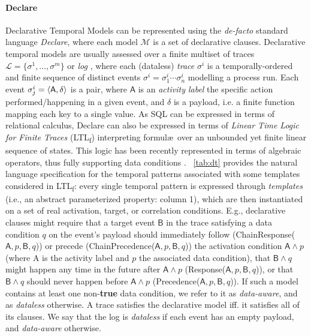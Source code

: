 \documentclass[sigconf]{acmart}
\newcommand{\LTLf}{\textup{LTL}\textsubscript{f}\xspace}
\begin{document}
\paragraph*{Declare} Declarative Temporal Models can be represented using the \textit{de-facto} standard language \textit{Declare}, where each model $\mathcal{M}$ is a set of declarative clauses. Declarative temporal models are usually assessed over a finite multiset of traces $\mathcal{L}=\{\sigma^1,\dots,\sigma^m\}$ or \textit{log} \cite{info14030173}, where each (dataless) \textit{trace} $\sigma^i$ is a temporally-ordered and finite sequence of distinct events $\sigma^i=\sigma^i_1\cdots \sigma^i_n$ modelling a process run. Each event $\sigma^i_j=\braket{\textsf{A},\delta}$ is a pair, where $\textsf{A}$ is an \textit{activity label} the specific action performed/happening in a given event, and $\delta$ is a payload, i.e. a finite function mapping each key to a single value. As SQL can be expressed in terms of relational calculus, Declare can also be expressed in terms of \textit{Linear Time Logic for Finite Traces} (\LTLf) \cite{Li2020} interpreting formul\ae\, over an unbounded yet finite linear sequence of states. This logic has been recently represented in terms of algebraic operators, thus fully supporting data conditions \cite{info14030173}.  \tablename~\ref{tab:dt} provides the natural language specification for the temporal patterns associated with some templates considered in \LTLf: every single temporal pattern is expressed through \textit{templates} (i.e., an abstract parameterized property: column 1), which are then instantiated on a set of real activation, target, or correlation conditions. E.g., declarative clauses might require that a target event $\textsf{B}$ in the trace satisfying a data condition $q$ on the event's payload should immediately follow (\textsf{ChainResponse}($\textsf{A},p,\textsf{B},q$)) or precede (\textsf{ChainPrecedence}($\textsf{A},p,\textsf{B},q$)) the activation condition $\textsf{A}\wedge p$ (where \textsf{A} is the activity label and $p$ the associated data condition), that $\textsf{B}\wedge q$ might happen any time in the future after $\textsf{A}\wedge p$ (\textsf{Response}($\textsf{A},p,\textsf{B},q$)), or that $\textsf{B}\wedge q$ should never
happen before $\textsf{A}\wedge p$ (\textsf{Precedence}($\textsf{A},p,\textsf{B},q$)). If such a model contains at least one non-\textbf{true} data condition, we refer to it as \textit{data-aware}, and as \textit{dataless} otherwise.  A trace satisfies the declarative model iff. it satisfies all of its clauses. We say that the log is \textit{dataless} if each event has an empty payload, and \textit{data-aware} otherwise.
\end{document}
